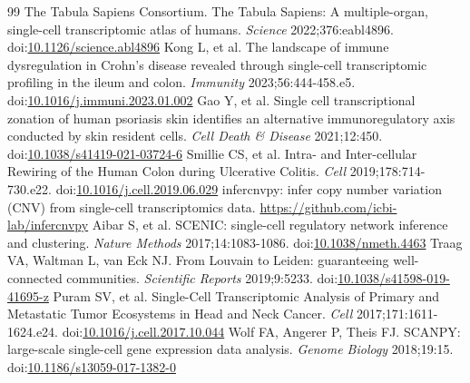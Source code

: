 \documentclass[11pt]{article}
\begin{document}
\begin{thebibliography}{99}
 The Tabula Sapiens Consortium. The Tabula Sapiens: A multiple-organ, single-cell transcriptomic atlas of humans. \emph{Science} 2022;376:eabl4896. doi:\href{https://doi.org/10.1126/science.abl4896}{10.1126/science.abl4896}
 Kong L, et al. The landscape of immune dysregulation in Crohn’s disease revealed through single-cell transcriptomic profiling in the ileum and colon. \emph{Immunity} 2023;56:444-458.e5. doi:\href{https://doi.org/10.1016/j.immuni.2023.01.002}{10.1016/j.immuni.2023.01.002}
 Gao Y, et al. Single cell transcriptional zonation of human psoriasis skin identifies an alternative immunoregulatory axis conducted by skin resident cells. \emph{Cell Death \& Disease} 2021;12:450. doi:\href{https://doi.org/10.1038/s41419-021-03724-6}{10.1038/s41419-021-03724-6}
 Smillie CS, et al. Intra- and Inter-cellular Rewiring of the Human Colon during Ulcerative Colitis. \emph{Cell} 2019;178:714-730.e22. doi:\href{https://doi.org/10.1016/j.cell.2019.06.029}{10.1016/j.cell.2019.06.029}
 infercnvpy: infer copy number variation (CNV) from single-cell transcriptomics data. \url{https://github.com/icbi-lab/infercnvpy}
 Aibar S, et al. SCENIC: single-cell regulatory network inference and clustering. \emph{Nature Methods} 2017;14:1083-1086. doi:\href{https://doi.org/10.1038/nmeth.4463}{10.1038/nmeth.4463}
 Traag VA, Waltman L, van Eck NJ. From Louvain to Leiden: guaranteeing well-connected communities. \emph{Scientific Reports} 2019;9:5233. doi:\href{https://doi.org/10.1038/s41598-019-41695-z}{10.1038/s41598-019-41695-z}
 Puram SV, et al. Single-Cell Transcriptomic Analysis of Primary and Metastatic Tumor Ecosystems in Head and Neck Cancer. \emph{Cell} 2017;171:1611-1624.e24. doi:\href{https://doi.org/10.1016/j.cell.2017.10.044}{10.1016/j.cell.2017.10.044}
 Wolf FA, Angerer P, Theis FJ. SCANPY: large-scale single-cell gene expression data analysis. \emph{Genome Biology} 2018;19:15. doi:\href{https://doi.org/10.1186/s13059-017-1382-0}{10.1186/s13059-017-1382-0}
\end{thebibliography}
\end{document}
